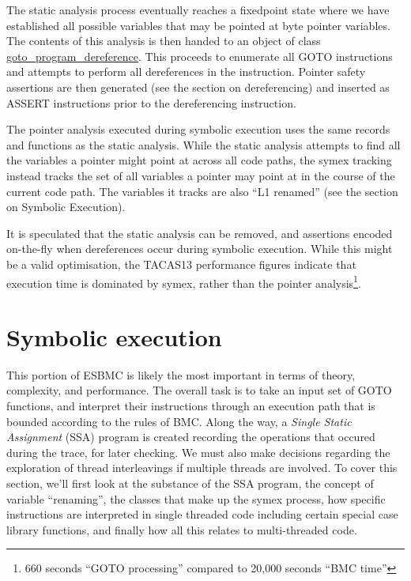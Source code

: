 \documentclass{article}
\begin{document}
The static analysis process eventually reaches a fixedpoint state where we
have established all possible variables that may be pointed at byte pointer
variables. The contents of this analysis is then handed to an object of
class \url{goto_program_dereference}. This proceeds to enumerate all
GOTO instructions and attempts to perform all dereferences in the instruction.
Pointer safety assertions are then generated (see the section on dereferencing)
and inserted as ASSERT instructions prior to the dereferencing instruction.

The pointer analysis executed during symbolic execution uses the same records
and functions as the static analysis. While the static analysis attempts to find
all the variables a pointer might point at across all code paths, the symex
tracking instead tracks the set of all variables a pointer may point at in the
course of the current code path. The variables it tracks are also ``L1 renamed''
(see the section on Symbolic Execution).

It is speculated that the static analysis can be removed, and assertions
encoded on-the-fly when dereferences occur during symbolic execution. While
this might be a valid optimisation, the TACAS13 performance figures indicate
that execution time is dominated by symex, rather than the pointer
analysis\footnote{660 seconds ``GOTO processing'' compared to 20,000 seconds
``BMC time''}.

\section{Symbolic execution}

This portion of ESBMC is likely the most important in terms of theory,
complexity, and performance. The overall task is to take an input set of
GOTO functions, and interpret their instructions through an execution path
that is bounded according to the rules of BMC. Along the way, a \textit{Single
Static Assignment} (SSA) program is created recording the operations that
occured during the trace, for later checking. We must also make decisions
regarding the exploration of thread interleavings if multiple threads are
involved. To cover this section, we'll first look at the substance of the
SSA program, the concept of variable ``renaming'', the classes that make up
the symex process, how specific instructions are interpreted in single
threaded code including certain special case library functions,
and finally how all this relates to multi-threaded code.
\end{document}
